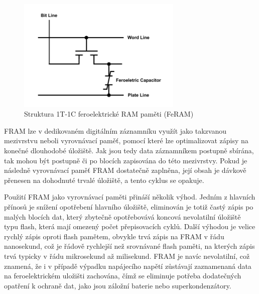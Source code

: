 \begin{figure}[h]
    \centering
    \includegraphics[width=0.70\textwidth]{obrazky-figures/fram_t1-c1.pdf}
    
    \caption{Struktura 1T-1C feroelektrické RAM paměti (FeRAM) \cite{researchgate_nonvolatile_memory_technologies}}
    \label{fig:feram-1t-1c}
\end{figure}

FRAM lze v dedikovaném digitálním záznamníku využít jako takzvanou mezivrstvu neboli vyrovnávací paměť, pomocí které lze optimalizovat zápisy na konečné dlouhodobé úložiště. Jak jsou tedy data záznamníkem postupně sbírána, tak mohou být postupně či po blocích zapisována do této mezivrstvy. Pokud je následně vyrovnávací paměť FRAM dostatečně zaplněna, její obsah je dávkově přenesen na dohodnuté trvalé úložiště, a tento cyklus se opakuje. 


Použití FRAM jako vyrovnávací paměti přináší několik výhod. Jedním z hlavních přínosů je snížení opotřebení hlavního úložiště, eliminován je totiž častý zápis po malých blocích dat, který zbytečně opotřebovává koncová nevolatilní úložiště typu flash, která mají omezený počet přepisovacích cyklů. Další výhodou je velice rychlý zápis oproti flash pamětem, obvykle trvá zápis na FRAM v řádu nanosekund, což je řádově rychlejší než srovnávané flash paměti, na kterých zápis trvá typicky v řádu mikrosekund až milisekund. FRAM je navíc nevolatilní, což znamená, že i v případě výpadku napájecího napětí zůstávají zaznamenaná data na feroelektrickém uložišti zachována, čímž se eliminuje potřeba dodatečných opatření k ochraně dat, jako jsou záložní baterie nebo superkondenzátory.

